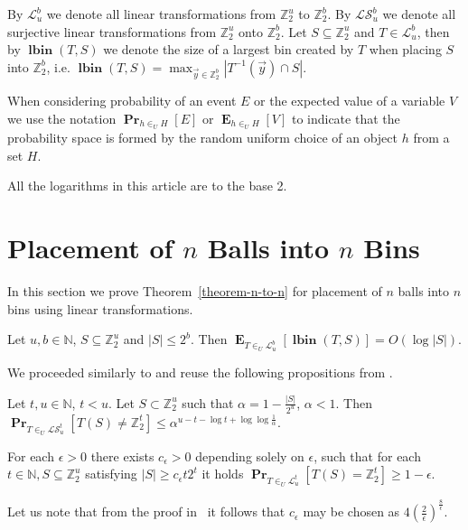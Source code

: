 \documentclass[unicode,review]{siamart1116}
\newcommand{\lbin}[2]{\operatorname{\mathbf{lbin}}({#1}, {#2})}
\newcommand{\vecspace}[2]{\mathbb{Z}_{#1}^{#2}}
\newcommand{\binvecspace}[1]{\vecspace{2}{#1}}
\newcommand{\linearmaps}[2]{\mathcal{L}_{#1}^{#2}}
\newcommand{\surjectivelinearmaps}[2]{\mathcal{LS}_{#1}^{#2}}
\newcommand{\probs}[2]{\operatorname{\mathbf{Pr}}_{{#1}}\left[{#2}\right]}
\newcommand{\expects}[2]{\operatorname{\mathbf{E}}_{{#1}}\left[{#2}\right]}
\numberwithin{theorem}{section}
\begin{document}
By $\linearmaps{u}{b}$ we denote all linear transformations from $\binvecspace{u}$ to $\binvecspace{b}$.
By $\surjectivelinearmaps{u}{b}$ we denote all surjective linear transformations from $\binvecspace{u}$ onto $\binvecspace{b}$.
Let $S \subseteq \binvecspace{u}$ and $T \in \linearmaps{u}{b}$, then by $\lbin{T}{S}$ we denote the size of a largest bin created by $T$ when placing $S$ into $\binvecspace{b}$, i.e. $\lbin{T}{S} = \operatorname{max}_{\vec y \in \binvecspace{b}} |T^{-1}(\vec y) \cap S|$.

When considering probability of an event $E$ or the expected value of a variable $V$ we use the notation $\probs{h \in_U H}{E}$ or $\expects{h \in_U H}{V}$ to indicate that the probability space is formed by the random uniform choice of an object $h$ from a set $H$.

All the logarithms in this article are to the base 2.

\section{Placement of \texorpdfstring{$n$}{n} Balls into \texorpdfstring{$n$}{n} Bins}

In this section we prove Theorem~\ref{theorem-n-to-n} for placement of $n$ balls into $n$ bins using linear transformations.
\begin{theorem}
\label{theorem-n-to-n}
Let $u, b \in \mathbb{N}$, $S \subseteq \binvecspace{u}$ and $|S| \leq 2^b$. Then $\expects{T \in_U \linearmaps{u}{b}}{\lbin{T}{S}} = O(\log |S|)$.
\end{theorem}

We proceeded similarly to \cite{alonetal} and reuse the following propositions from \cite{alonetal}.
\begin{proposition}
\label{proposition-prob-bound}
Let $t, u \in \mathbb{N}$, $t < u$.
Let $S \subset \binvecspace{u}$ such that $\alpha = 1 - \frac{|S|}{2^u}$, $\alpha < 1$.
Then $\probs{T \in_U \surjectivelinearmaps{u}{t}}{T(S) \neq \binvecspace{t}} \leq \alpha^{u - t - \log t + \log \log \frac{1}{\alpha}}$.
\end{proposition}

\begin{proposition}
\label{proposition-epsilon}
For each $\epsilon > 0$ there exists $c_\epsilon > 0$ depending solely on $\epsilon$, such that for each $t \in \mathbb{N}, S \subseteq \binvecspace{u}$ satisfying $|S| \geq c_\epsilon t 2^t$ it holds $\probs{T \in_U \linearmaps{u}{t}}{T(S) = \binvecspace{t}} \geq 1 - \epsilon$.
\end{proposition}
Let us note that from the proof in~\cite{alonetal} it follows that $c_\epsilon$ may be chosen as $4\left(\frac{2}{\epsilon}\right)^{\frac{8}{\epsilon}}$.
\end{document}
